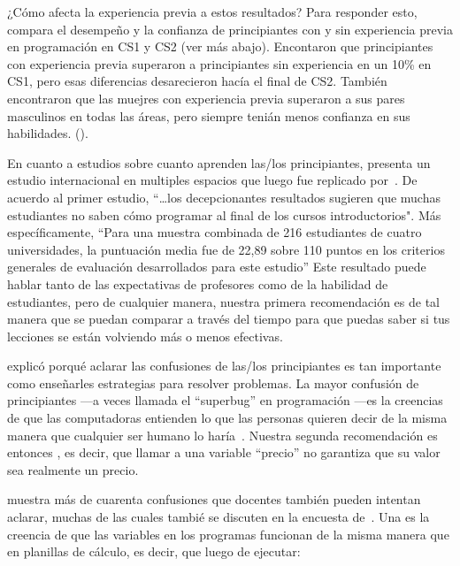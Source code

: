 ¿Cómo afecta la experiencia previa a estos resultados?
Para responder esto, 
\cite{Wilc2018} compara el desempeño y la confianza de principiantes
con y sin experiencia previa en programación en CS1 y CS2 (ver más abajo).
Encontaron que principiantes con experiencia previa superaron a principiantes sin experiencia en un 10\% en CS1,
pero esas diferencias desarecieron hacía el final de CS2.
También encontraron que las muejres con experiencia previa superaron a sus pares masculinos en todas las áreas,
pero siempre tenián menos confianza en sus habilidades. ().

En cuanto a estudios sobre cuanto aprenden las/los principiantes,
\cite{McCr2001} presenta un estudio internacional en multiples espacios que luego fue replicado por~\cite{Utti2013}.
De acuerdo al primer estudio,
``{\ldots}los decepcionantes resultados sugieren que
muchas estudiantes no saben cómo programar al final de los cursos introductorios".
Más específicamente,
``Para una muestra combinada de 216 estudiantes de cuatro universidades,
la puntuación media fue de 22,89 sobre 110 puntos en los criterios generales de evaluación desarrollados para este estudio''
Este resultado puede hablar tanto de las expectativas de profesores como de la habilidad de estudiantes,
pero de cualquier manera,
nuestra primera recomendación es 
de tal manera que se puedan comparar a través del tiempo para que puedas saber si tus lecciones se están volviendo más o menos efectivas.


 explicó porqué aclarar las confusiones de las/los principiantes es tan importante como enseñarles
estrategias para resolver problemas.
La mayor confusión de principiantes ---a veces llamada el ``superbug'' en programación ---es
la creencias de que las computadoras entienden lo que las personas quieren decir de la misma manera que cualquier ser humano lo haría~\cite{Pea1986}.
Nuestra segunda recomendación es entonces ,
es decir, que llamar a una variable ``precio'' no garantiza que su valor sea realmente un precio.

\cite{Sorv2018}  muestra más de cuarenta confusiones que docentes también pueden intentan aclarar,
muchas de las cuales tambié se discuten en la encuesta de~\cite{Qian2017}.
Una es la creencia de que las variables en los programas funcionan de la misma manera que en planillas de cálculo,
es decir, que luego de ejecutar:

